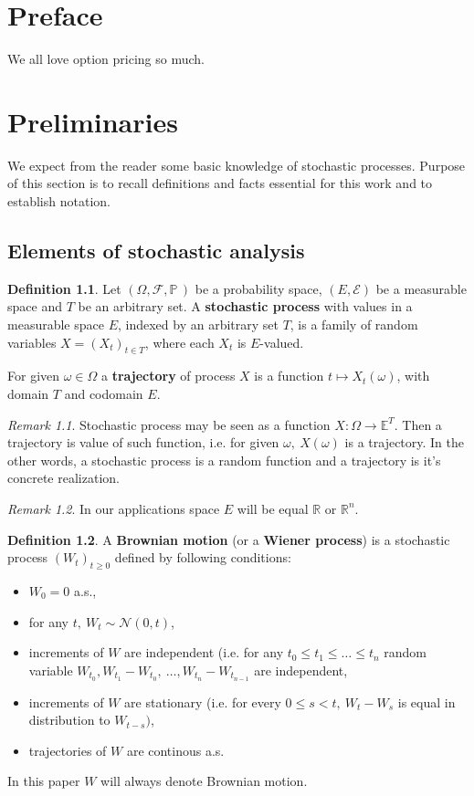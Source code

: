 \documentclass[a4paper,12pt, oneside]{book}
\theoremstyle{definition}
\newtheorem{mydef}{Definition}[chapter]
\theoremstyle{remark}
\newtheorem{remark}{Remark}[chapter]
\def\P{{\mathbb{P}}\,}
\def\R{{\mathbb{R}}}
\begin{document}
\chapter*{Preface}
We all love option pricing so much.

\chapter{Preliminaries}
We expect from the reader some basic knowledge of stochastic processes. Purpose of this section is to recall definitions and facts essential for this work and to establish notation.

\section{Elements of stochastic analysis}
\begin{mydef}
 Let $(\Omega, \mathcal{F}, \P)$ be a probability space, $(E, \mathcal{E})$ be a measurable space and $T$ be an arbitrary set. A \textbf{stochastic process} with values in a measurable space $E$, indexed by an arbitrary set $T$, is a family of random variables $X = (X_t)_{t \in T}$, where each $X_t$ is $E$-valued.
 
 For given $\omega \in \Omega$ a \textbf{trajectory} of process $X$ is a function $t \mapsto X_t(\omega)$, with domain $T$ and codomain $E$.
\end{mydef}

\begin{remark}
 Stochastic process may be seen as a function $X: \Omega \rightarrow \mathbb{E}^T$. Then a trajectory is value of such function, i.e. for given $\omega,\ X(\omega)$ is a trajectory. In the other words, a stochastic process is a random function and a trajectory is it's concrete realization.
\end{remark}

\begin{remark}
 In our applications space $E$ will be equal $\R$ or $\R^n$. 
\end{remark}

\begin{mydef}
 A \textbf{Brownian motion} (or a \textbf{Wiener process}) is a stochastic process $(W_t)_{t \geq 0}$ defined by following conditions:
 \begin{itemize}
  \item $W_0 = 0$ a.s.,
  \item for any $t,\ W_t \sim \mathcal{N}(0,t)$,
  \item increments of $W$ are independent (i.e. for any $t_0 \leq t_1 \leq \ldots \leq t_n$ random variable $W_{t_0}, W_{t_1} - W_{t_0},\ \ldots, W_{t_n} - W_{t_{n-1}}$ are independent,
  \item increments of $W$ are stationary (i.e. for every $0 \leq s < t,\ W_t-W_s$ is equal in distribution to $W_{t-s})$,
  \item trajectories of $W$ are continous a.s.
 \end{itemize}
\end{mydef}
\noindent In this paper $W$ will always denote Brownian motion.
\end{document}
